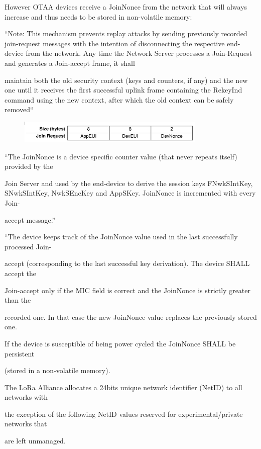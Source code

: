 {{However OTAA devices receive a JoinNonce from the network that will
always increase and thus needs to be stored in non-volatile memory:}

{``Note: This mechanism prevents replay attacks by sending previously
recorded join-request messages with the intention of disconnecting the
respective end-device from the network. Any time the Network Server
processes a Join-Request and generates a Join-accept frame, it shall}

{maintain both the old security context (keys and counters, if any) and
the new one until it receives the first successful uplink frame
containing the RekeyInd command using the new context, after which the
old context can be safely removed``}

\begin{figure}[h!]
{\includegraphics[width=0.8\textwidth]{images/image16.png}}
\end{figure}

{``The JoinNonce is a device specific counter value (that never repeats
itself) provided by the}

{Join Server and used by the end-device to derive the session keys
FNwkSIntKey, SNwkSIntKey, NwkSEncKey and AppSKey. JoinNonce is
incremented with every Join-}

{accept message.''}

{``The device keeps track of the JoinNonce value used in the last
successfully processed Join-}

{accept (corresponding to the last successful key derivation). The
device SHALL accept the}

{Join-accept only if the MIC field is correct and the JoinNonce is
strictly greater than the}

{recorded one. In that case the new JoinNonce value replaces the
previously stored one.}

{If the device is susceptible of being power cycled the JoinNonce SHALL
be persistent}

{(stored in a non-volatile memory).}

{The LoRa Alliance allocates a 24bits unique network identifier (NetID)
to all networks with}

{the exception of the following NetID values reserved for
experimental/private networks that}

{are left unmanaged.}

}
